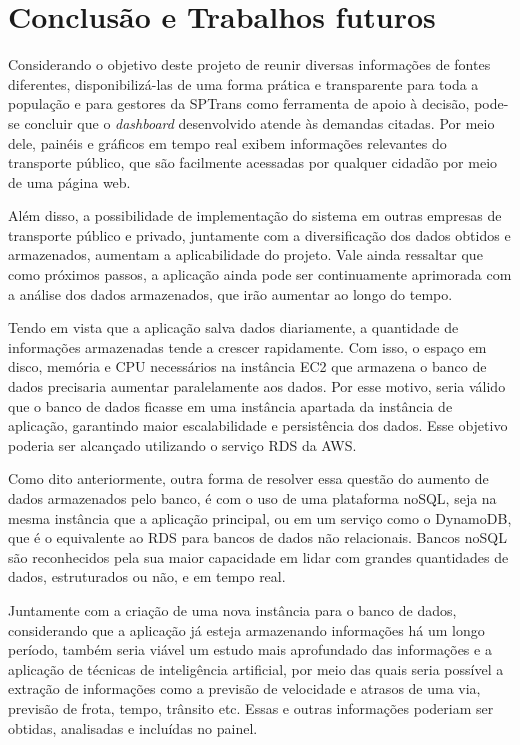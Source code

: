 \chapter{Conclusão e Trabalhos futuros}
\label{Cap:Conclusoes}
\indent
\par Considerando o objetivo deste projeto de reunir diversas informações de fontes diferentes, disponibilizá-las de uma forma prática e transparente para toda a população e para gestores da SPTrans como ferramenta de apoio à decisão, pode-se concluir que o \textit{dashboard} desenvolvido atende às demandas citadas. Por meio dele, painéis e gráficos em tempo real exibem informações relevantes do transporte público, que são facilmente acessadas por qualquer cidadão por meio de uma página web.
\indent
\par Além disso, a possibilidade de implementação do sistema em outras empresas de transporte público e privado, juntamente com a diversificação dos dados obtidos e armazenados, aumentam a aplicabilidade do projeto. Vale ainda ressaltar que como próximos passos, a aplicação ainda pode ser continuamente aprimorada com a análise dos dados armazenados, que irão aumentar ao longo do tempo.
\indent
\par Tendo em vista que a aplicação salva dados diariamente, a quantidade de informações armazenadas tende a crescer rapidamente. Com isso, o espaço em disco, memória e CPU necessários na instância EC2 que armazena o banco de dados precisaria aumentar paralelamente aos dados. Por esse motivo, seria válido que o banco de dados ficasse em uma instância apartada da instância de aplicação, garantindo maior escalabilidade e persistência dos dados. Esse objetivo poderia ser alcançado utilizando o serviço RDS da AWS.
\indent
\par Como dito anteriormente, outra forma de resolver essa questão do aumento de dados armazenados pelo banco, é com o uso de uma plataforma noSQL, seja na mesma instância que a aplicação principal, ou em um serviço como o DynamoDB, que é o equivalente ao RDS para bancos de dados não relacionais. Bancos noSQL são reconhecidos pela sua maior capacidade em lidar com grandes quantidades de dados, estruturados ou não, e em tempo real.
\indent
\par Juntamente com a criação de uma nova instância para o banco de dados, considerando que a aplicação já esteja armazenando informações há um longo período, também seria viável um estudo mais aprofundado das informações e a aplicação de técnicas de inteligência artificial, por meio das quais seria possível a extração de informações como a previsão de velocidade e atrasos de uma via, previsão de frota, tempo, trânsito etc. Essas e outras informações poderiam ser obtidas, analisadas e incluídas no painel.
